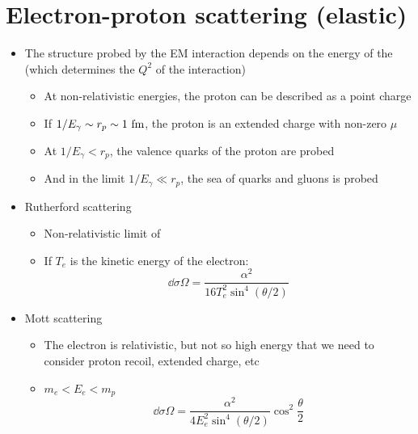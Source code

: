 
\section{Electron-proton scattering (elastic)}
\begin{itemize}
  \item The structure probed by the EM interaction depends on the energy of the \el (which determines the $Q^2$ of the interaction)
  \begin{itemize}
    \item At non-relativistic energies, the proton can be described as a point charge
    \item If $1/E_\gamma \sim r_p \sim 1~\text{fm}$, the proton is an extended charge with non-zero $\mu$
    \item At $1/E_\gamma < r_p$, the valence quarks of the proton are probed
    \item And in the limit $1/E_\gamma \ll r_p$, the sea of quarks and gluons is probed
  \end{itemize}
  \item Rutherford scattering
  \begin{itemize}
    \item Non-relativistic limit of \el
    \item If $T_e$ is the kinetic energy of the electron:
    \begin{equation}
      \dd\sigma\Omega = \dfrac{\alpha^2}{16 T_e^2\sin^4(\theta/2)}
    \end{equation}
  \end{itemize}
  \item Mott scattering
  \begin{itemize}
    \item The electron is relativistic, but not so high energy that we need to consider proton recoil, extended charge, etc
    \item $m_e < E_e < m_p$
    \begin{equation}
      \dd\sigma\Omega = \dfrac{\alpha^2}{4E_e^2\sin^4(\theta/2)}\cos^2\frac\theta 2
    \end{equation}
  \end{itemize}
\end{itemize}

